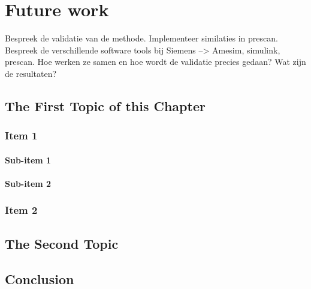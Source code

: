 \chapter{Future work}
\label{cha:Validation}

Bespreek de validatie van de methode. Implementeer similaties in prescan.
Bespreek de verschillende software tools bij Siemens --> Amesim, simulink, prescan.
Hoe werken ze samen en hoe wordt de validatie precies gedaan? Wat zijn de resultaten?

\section{The First Topic of this Chapter}
\subsection{Item 1}
\subsubsection{Sub-item 1}


\subsubsection{Sub-item 2}


\subsection{Item 2}


\section{The Second Topic}


\section{Conclusion}

